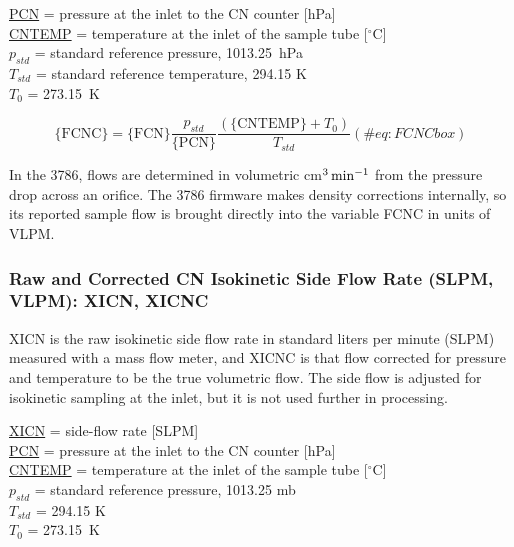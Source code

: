 \documentclass[
  english,
]{book}
\begin{document}
\protect\hyperlink{pcn}{PCN} = pressure at the inlet to the CN counter
{[}hPa{]}\\
\protect\hyperlink{cntemp}{CNTEMP} = temperature at the inlet of the
sample tube {[}\(^{\circ}\)C{]}\\
\(p_{std}\) = standard
reference pressure, 1013.25~hPa\\
\(T_{std}\) = standard
reference temperature, 294.15 K\\
\(T_{0}\) = 273.15~K

\begin{equation}
\mathrm{\{FCNC\} = \{FCN\}}\frac{p_{std}}{\mathrm{\{PCN\}}}\frac{(\{\mathrm{CNTEMP\}}+T_{0})}{T_{std}}
(\#eq:FCNCbox)
\end{equation}

In the 3786, flows are determined in volumetric
cm{\(^{3}\thinspace\mathrm{min}^{-1}\)} from the pressure drop across an
orifice. The 3786 firmware makes density corrections internally, so its
reported sample flow is brought directly into the variable FCNC in units
of VLPM.

\hypertarget{xicnc}{%
\subsubsection*{Raw and Corrected CN Isokinetic Side Flow Rate (SLPM,
VLPM): XICN, XICNC}\label{xicnc}}

XICN is the raw isokinetic side flow rate in standard liters per minute
(SLPM) measured with a mass flow meter, and XICNC is that flow corrected
for pressure and temperature to be the true volumetric flow. The side
flow is adjusted for isokinetic sampling at the inlet, but it is not
used further in processing.

\protect\hyperlink{xicnc}{XICN} = side-flow rate {[}SLPM{]}\\
\protect\hyperlink{pcn}{PCN} = pressure at the inlet to the CN counter
{[}hPa{]}\\
\protect\hyperlink{cntemp}{CNTEMP} = temperature at the inlet of the
sample tube {[}\(^{\circ}\)C{]}\\
\(p_{std}\) = standard reference pressure, 1013.25 mb\\
\(T_{std}\)
= 294.15 K\\
\(T_{0}\) = 273.15~K
\end{document}
